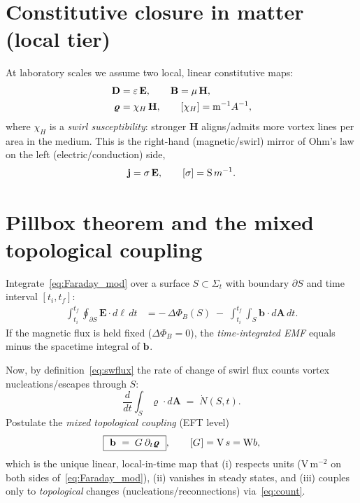 \documentclass[10pt,reprint,aps,onecolumn,nofootinbib]{revtex4-2}
\def\boldsymbol#1{#1}%
\def\mathcal#1{#1}%
\def\!{}%
\def\swirlarrow{}%
\DeclareRobustCommand{\swirlarrow}{%
    \mathchoice{\mkern-2mu\scriptstyle\boldsymbol{\circlearrowleft}}%
    {\mkern-2mu\scriptstyle\boldsymbol{\circlearrowleft}}%
    {\mkern-2mu\scriptscriptstyle\boldsymbol{\circlearrowleft}}%
    {\mkern-2mu\scriptscriptstyle\boldsymbol{\circlearrowleft}}%
}
\begin{document}
\section{Constitutive closure in matter (local tier)}
At laboratory scales we assume two local, linear constitutive maps:
\begin{align}
\mathbf D &= \varepsilon\,\mathbf E, \qquad \mathbf B = \mu\,\mathbf H, \\
\bm{\varrho}_{\swirlarrow} &= \chi_H \,\mathbf H, \qquad [\chi_H] = {\textrm m^{-1}A^{-1}},
\label{eq:local_const}
\end{align}
where $\chi_H$ is a \emph{swirl susceptibility}: stronger $\mathbf H$ aligns/admits more vortex lines per area in the medium. This is the right-hand (magnetic/swirl) mirror of Ohm’s law on the left (electric/conduction) side,
\begin{equation}
\mathbf j = \sigma\,\mathbf E,
\qquad [\sigma]={\textrm S\,m^{-1}}.
\end{equation}

\section{Pillbox theorem and the mixed topological coupling}
Integrate~\ref{eq:Faraday_mod} over a surface $S\subset \Sigma_t$ with boundary $\partial S$ and time interval $[t_i,t_f]$:
\begin{align}
\int_{t_i}^{t_f}\!\!\oint_{\partial S}\mathbf E\!\cdot d\boldsymbol\ell\,dt
&= -\,\Delta\Phi_B(S) \;-\; \int_{t_i}^{t_f}\!\!\int_S \mathbf b_{\swirlarrow}\!\cdot d\mathbf A\,dt.
\label{eq:pillbox1}
\end{align}
If the magnetic flux is held fixed ($\Delta\Phi_B=0$), the \emph{time-integrated EMF} equals minus the spacetime integral of $\mathbf b_{\swirlarrow}$.

Now, by definition~\ref{eq:swflux} the rate of change of swirl flux counts vortex nucleations/escapes through $S$:
\begin{equation}
\frac{d}{dt}\!\int_S \bm{\varrho}_{\swirlarrow}\!\cdot d\mathbf A \;=\; \dot N(S,t).
\label{eq:count}
\end{equation}
Postulate the \emph{mixed topological coupling} (EFT level)
\begin{equation}
\boxed{\ \mathbf b_{\swirlarrow} \;=\; \mathcal G_{\swirlarrow}\,\partial_t\bm{\varrho}_{\swirlarrow}\ },
\qquad [\mathcal G_{\swirlarrow}]={\textrm V\,s}= {\textrm Wb},
\label{eq:mix}
\end{equation}
which is the unique linear, local-in-time map that (i) respects units ($\mathrm{V\,m^{-2}}$ on both sides of~\ref{eq:Faraday_mod}), (ii) vanishes in steady states, and (iii) couples only to \emph{topological} changes (nucleations/reconnections) via~\ref{eq:count}.
\end{document}
